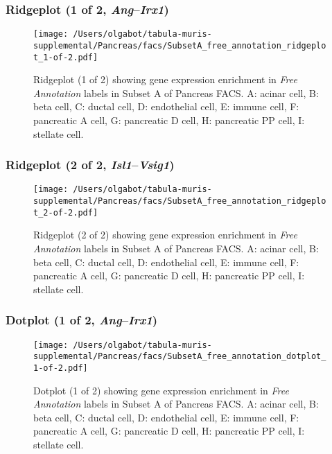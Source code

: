 \clearpage

\subsubsection{Ridgeplot (1 of 2, \emph{Ang}--\emph{Irx1})}
\begin{figure}[h]
\centering
\texttt{[image: /Users/olgabot/tabula-muris-supplemental/Pancreas/facs/SubsetA\_free\_annotation\_ridgeplot\_1-of-2.pdf]}

\caption{ Ridgeplot (1 of 2)  showing gene expression enrichment in \emph{Free Annotation} labels in Subset A of Pancreas FACS. A: acinar cell, B: beta cell, C: ductal cell, D: endothelial cell, E: immune cell, F: pancreatic A cell, G: pancreatic D cell, H: pancreatic PP cell, I: stellate cell.}
\end{figure}


\clearpage

\subsubsection{Ridgeplot (2 of 2, \emph{Isl1}--\emph{Vsig1})}
\begin{figure}[h]
\centering
\texttt{[image: /Users/olgabot/tabula-muris-supplemental/Pancreas/facs/SubsetA\_free\_annotation\_ridgeplot\_2-of-2.pdf]}

\caption{ Ridgeplot (2 of 2)  showing gene expression enrichment in \emph{Free Annotation} labels in Subset A of Pancreas FACS. A: acinar cell, B: beta cell, C: ductal cell, D: endothelial cell, E: immune cell, F: pancreatic A cell, G: pancreatic D cell, H: pancreatic PP cell, I: stellate cell.}
\end{figure}


\clearpage

\subsubsection{Dotplot (1 of 2, \emph{Ang}--\emph{Irx1})}
\begin{figure}[h]
\centering
\texttt{[image: /Users/olgabot/tabula-muris-supplemental/Pancreas/facs/SubsetA\_free\_annotation\_dotplot\_1-of-2.pdf]}

\caption{ Dotplot (1 of 2)  showing gene expression enrichment in \emph{Free Annotation} labels in Subset A of Pancreas FACS. A: acinar cell, B: beta cell, C: ductal cell, D: endothelial cell, E: immune cell, F: pancreatic A cell, G: pancreatic D cell, H: pancreatic PP cell, I: stellate cell.}
\end{figure}


